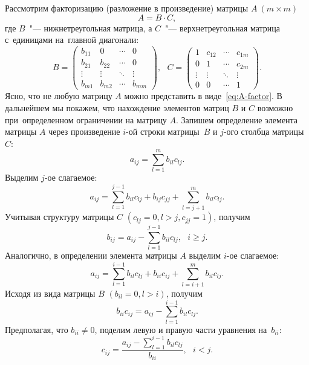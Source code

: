 \documentclass[11pt,a4paper,twoside]{report}
\numberwithin{equation}{section}
\theoremstyle{definition}
\theoremstyle{plain}
\begin{document}
Рассмотрим факторизацию (разложение в произведение) матрицы $A~(m \times m)$
%
\begin{equation}
    \label{eq:A-factor}
    A = B \cdot C,
\end{equation}
%
где $B$~"--- нижнетреугольная матрица, а $C$~"--- верхнетреугольная матрица
с~единицами на~главной диагонали:
%
$$
    B =
    \begin{pmatrix}
        b_{11} & 0      & \cdots & 0      \\
        b_{21} & b_{22} & \cdots & 0      \\
        \vdots & \vdots & \ddots & \vdots \\
        b_{m1} & b_{m2} & \cdots & b_{mm}
    \end{pmatrix},
    ~~~C =
    \begin{pmatrix}
        1      & c_{12} & \cdots & c_{1m} \\
        0      & 1      & \cdots & c_{2m} \\
        \vdots & \vdots & \ddots & \vdots \\
        0      & 0      & \cdots & 1
    \end{pmatrix}.
$$
%
Ясно, что не любую матрицу $A$ можно представить в виде~\eqref{eq:A-factor}.
В дальнейшем мы покажем, что нахождение элементов матриц $B$ и $C$
возможно при~определенном ограничении на матрицу $A$.
Запишем определение элемента матрицы $A$ через произведение $i$-ой строки
матрицы~$B$ и $j$-ого столбца матрицы~$C$:
%
$$
    a_{ij} = \sum\limits_{l=1}^m b_{il}c_{lj}.
$$
%
Выделим $j$-ое слагаемое:
%
$$
    a_{ij} = \sum\limits_{l=1}^{j-1}b_{il}c_{lj} + b_{ij}c_{jj} +
             \sum\limits_{l=j+1}^m b_{il}c_{lj}.
$$
%
Учитывая структуру матрицы $C$ $(c_{lj} = 0, l > j, c_{jj} = 1)$, получим
%
\begin{equation}
    \label{eq:b-ij}
    b_{ij} = a_{ij} - \sum\limits_{l=1}^{j-1}b_{il}c_{lj},~~~i \geqslant j.
\end{equation}
%
Аналогично, в определении элемента матрицы $A$ выделим $i$-ое слагаемое:
%
$$
    a_{ij} = \sum\limits_{l=1}^{i-1}b_{il}c_{lj} + b_{ii}c_{ij} +
             \sum\limits_{l=i+1}^m b_{il}c_{lj}.
$$
%
Исходя из вида матрицы $B$ $(b_{il} = 0, l > i)$, получим
%
$$
    b_{ii}c_{ij} = a_{ij} - \sum\limits_{l=1}^{i-1}b_{il}c_{lj}.
$$
%
Предполагая, что $b_{ii} \ne 0$, поделим левую и правую части уравнения
на~$b_{ii}$:
%
\begin{equation}
    \label{eq:c-ij}
    c_{ij} = \frac{a_{ij} - \sum\limits_{l=1}^{i-1}b_{il}c_{lj}}{b_{ii}},
    ~~~i < j.
\end{equation}
\end{document}
